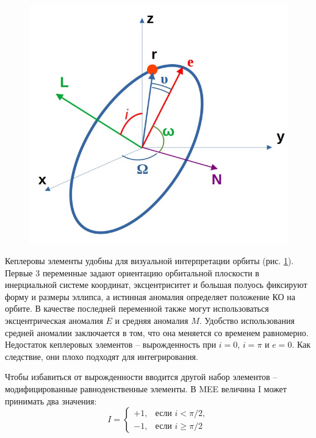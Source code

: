 \begin{figure}[h!]
    \centering
    \includegraphics[width=0.6\linewidth]{../images/review/kepler.jpg}
    \label{fig:kepler}
\end{figure}

Кеплеровы элементы удобны для визуальной интерпретации орбиты (рис. \ref{fig:kepler}).
Первые 3 переменные задают ориентацию орбитальной плоскости в инерциальной системе координат,
эксцентриситет и большая полуось фиксируют форму и размеры эллипса, а истинная аномалия определяет положение КО на орбите.
В качестве последней переменной также могут использоваться эксцентрическая аномалия $E$ и средняя аномалия $M$.
Удобство использования средней аномалии заключается в том, что она меняется со временем равномерно.
Недостаток кеплеровых элементов -- вырожденность при $i = 0$, $i = \pi$ и $e = 0$.
Как следствие, они плохо подходят для интегрирования.

Чтобы избавиться от вырожденности вводится другой набор элементов -- модифицированные равноденственные элементы.
В MEE величина I может принимать два значения:
\[
I = \left\{
\begin{array}{ll}
+1, & \text{если } i < \pi / 2, \\
-1, & \text{если } i \ge \pi / 2
\end{array}
\right.
\]

